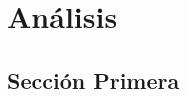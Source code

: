 \documentclass[12pt]{book}
\begin{document}
%



\frontmatter


\mainmatter
\printnoidxglossaries
    

    

    

    \chapter{Análisis}
        \section{Sección Primera}
            \lipsum[9-12]

    

    

    
    
    

    
    
\end{document}
